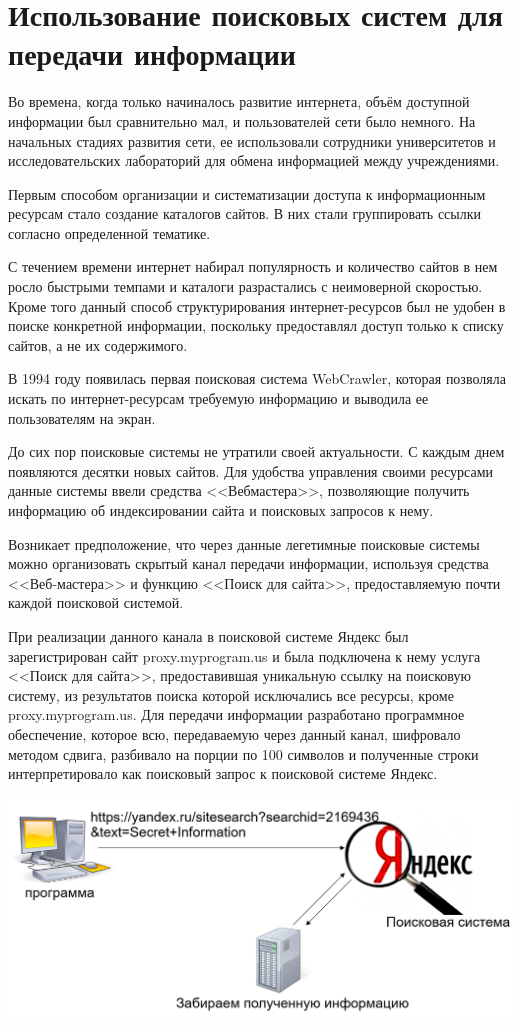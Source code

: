 \section{Использование поисковых систем для передачи информации}

Во времена, когда только начиналось развитие интернета, объём доступной информации был сравнительно мал, и пользователей сети было немного. На начальных стадиях развития сети, ее использовали сотрудники университетов и исследовательских лабораторий для обмена информацией между учреждениями.

Первым способом организации и систематизации доступа к информационным ресурсам стало создание каталогов сайтов. В них стали группировать ссылки согласно определенной тематике.

С течением времени интернет набирал популярность и количество сайтов в нем росло быстрыми темпами и каталоги разрастались с неимоверной скоростью. Кроме того данный способ структурирования интернет-ресурсов был не удобен в поиске конкретной информации, поскольку предоставлял доступ только к списку сайтов, а не их содержимого.

В 1994 году появилась первая поисковая система WebCrawler, которая позволяла искать по интернет-ресурсам требуемую информацию и выводила ее пользователям на экран.

До сих пор поисковые системы не утратили своей актуальности. С каждым днем появляются десятки новых сайтов. Для удобства управления своими ресурсами данные системы ввели средства <<Вебмастера>>, позволяющие получить информацию об индексировании сайта и поисковых запросов к нему.

Возникает предположение, что через данные легетимные поисковые системы можно организовать скрытый канал передачи информации, используя средства <<Веб-мастера>> и функцию <<Поиск для сайта>>, предоставляемую почти каждой поисковой системой.

При реализации данного канала в поисковой системе Яндекс был зарегистрирован сайт proxy.myprogram.us и была подключена к нему услуга <<Поиск для сайта>>, предоставившая уникальную ссылку на поисковую систему, из результатов поиска которой исключались все ресурсы, кроме proxy.myprogram.us. Для передачи информации разработано программное обеспечение, которое всю, передаваемую через данный канал, шифровало методом сдвига, разбивало на порции по 100 символов и полученные строки интерпретировало как поисковый запрос к поисковой системе Яндекс.

\includegraphics[width=1\linewidth]{3--yandex.png}

